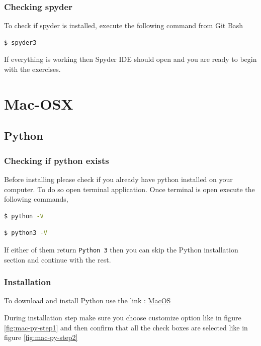 \documentclass{cmc}
\begin{document}
\subsubsection{Checking spyder}
\label{sec-win:checking-if-spyder}

To check if spyder is installed, execute the following command from
Git Bash

\begin{lstlisting}[language=bash]
$ spyder3
\end{lstlisting}

If everything is working then Spyder IDE should open and you are ready
to begin with the exercises.

\newpage
\section{Mac-OSX}
\label{sec:mac}

\subsection{Python}
\label{sec-mac:python}
\subsubsection{Checking if python exists}
\label{sec-mac:checking-if-python}
Before installing please check if you already have python installed on
your computer. To do so open terminal application.  Once terminal is
open execute the following commands,
\begin{lstlisting}[language=bash]
$ python -V
\end{lstlisting}
\begin{lstlisting}[language=bash]
$ python3 -V
\end{lstlisting}

If either of them return \verb|Python 3| then you can skip the Python
installation section and continue with the rest.

\subsubsection{Installation}
\label{sec-mac:installation-python}

To download and install Python use the link :
\href{https://www.python.org/downloads/mac-osx/}{MacOS}

During installation step make sure you choose customize option like in
figure \ref{fig:mac-py-step1} and then confirm that all the check
boxes are selected like in figure \ref{fig:mac-py-step2}
\end{document}
